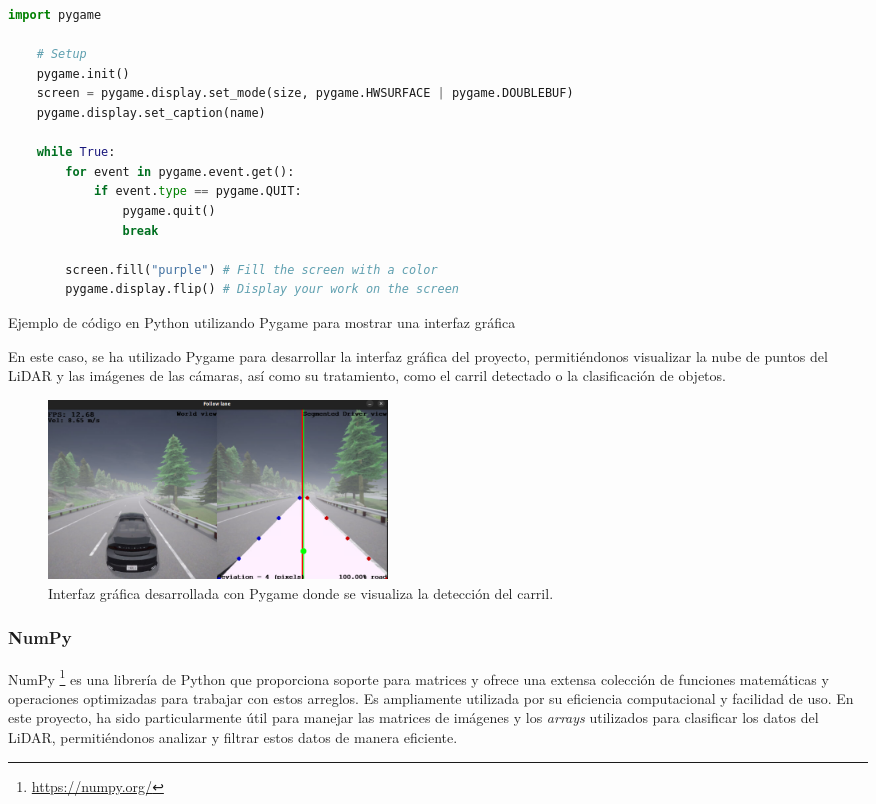 \begin{code}[h]
\begin{lstlisting}[language=Python]
	 import pygame
	
	# Setup
	pygame.init()
	screen = pygame.display.set_mode(size, pygame.HWSURFACE | pygame.DOUBLEBUF)
	pygame.display.set_caption(name)

	while True:
	    for event in pygame.event.get():
	        if event.type == pygame.QUIT:
	            pygame.quit()
	            break

	    screen.fill("purple") # Fill the screen with a color
	    pygame.display.flip() # Display your work on the screen

\end{lstlisting}
\caption[Ejemplo de código en Python utilizando Pygame]{Ejemplo de código en Python utilizando Pygame para mostrar una interfaz gráfica}
\label{cod:pygame}
\end{code}

 En este caso, se ha utilizado Pygame para desarrollar la interfaz gráfica del proyecto, permitiéndonos visualizar la nube de puntos del \ac{LiDAR} y las imágenes de las cámaras, así como su tratamiento, como el carril detectado o la clasificación de objetos.

\begin{figure}[ht]
  \begin{center}
    \includegraphics[width=9cm]{figs/Plataformas_Desarollo/pygame.png}
  \end{center}
  \caption{Interfaz gráfica desarrollada con Pygame donde se visualiza la detección del carril.}
  \label{foto_pygame}
\end{figure}

\subsubsection{NumPy}
\label{sec:numpy}

NumPy \footnote{\url{https://numpy.org/}} es una librería de Python que proporciona soporte para matrices y ofrece una extensa colección de funciones matemáticas y operaciones optimizadas para trabajar con estos arreglos. Es ampliamente utilizada por su eficiencia computacional y facilidad de uso. En este proyecto, ha sido particularmente útil para manejar las matrices de imágenes y los \textit{arrays} utilizados para clasificar los datos del \ac{LiDAR}, permitiéndonos analizar y filtrar estos datos de manera eficiente.

